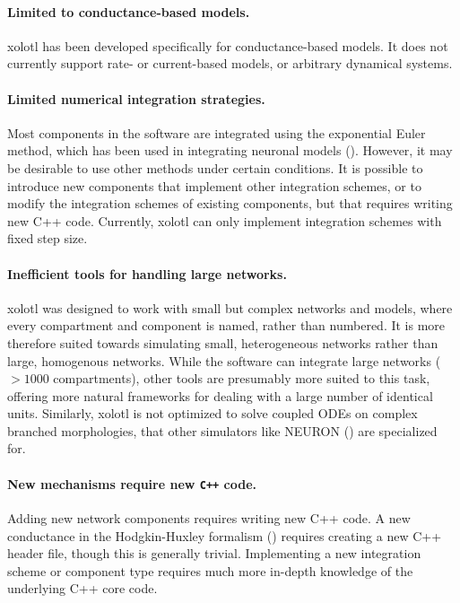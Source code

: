 \documentclass{frontiersSCNS} %
\begin{document}
\paragraph{Limited to conductance-based models.} xolotl has been developed specifically for conductance-based models. It does not currently support rate- or current-based models, or arbitrary dynamical systems.

\paragraph{Limited numerical integration strategies.} Most components in the software are integrated using the exponential Euler method, which has been used in integrating neuronal models (\cite{ohErrorAnalysisSpecialized2006, dayanTheoreticalNeuroscience2001}). However, it may be desirable to use other methods under certain conditions. It is possible to introduce new components that implement other integration schemes, or to modify the integration schemes of existing components, but that requires writing new C++  code. Currently, xolotl can only implement integration schemes with fixed step size.

\paragraph{Inefficient tools for handling large networks.} xolotl was designed to work with small but complex networks and models, where every compartment and component is named, rather than numbered. It is more therefore suited towards simulating small, heterogeneous networks rather than large, homogenous networks. While the software can integrate large networks ($>1000$ compartments), other tools are presumably more suited to this task, offering more natural frameworks for dealing with a large number of identical units. Similarly, xolotl is not optimized to solve coupled ODEs on complex branched morphologies, that other simulators like NEURON (\cite{hinesNEURONSimulationEnvironment1997}) are specialized for. 

\paragraph{New mechanisms require new \texttt{C++} code.} Adding new network components requires writing new C++ code. A new conductance in the Hodgkin-Huxley formalism (\cite{hodgkinComponentsMembraneConductance1952, hodgkinMeasurementCurrentvoltageRelations1952, hodgkinQuantitativeDescriptionMembrane1952, dayanTheoreticalNeuroscience2001}) requires creating a new C++ header file, though this is generally trivial. Implementing a new integration scheme or component type requires much more in-depth knowledge of the underlying C++ core code.
\end{document}
